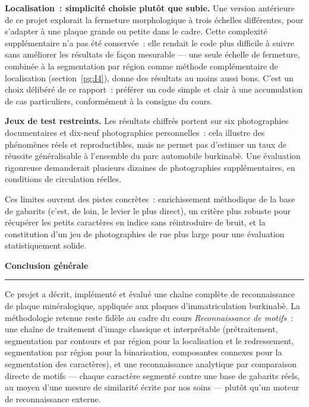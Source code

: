 \documentclass[11pt,a4paper]{article}
\newcommand{\titrecentre}[1]{%
  \begingroup
  \centering\normalfont\huge\bfseries\sffamily#1\par
  \endgroup
  \begin{center}\vspace{4pt}\rule{4cm}{0.8pt}\end{center}
  \vspace{16pt}
}
\begin{document}
\textbf{Localisation~: simplicité choisie plutôt que subie.} Une version antérieure de ce projet explorait la fermeture morphologique à trois échelles différentes, pour s'adapter à une plaque grande ou petite dans le cadre. Cette complexité supplémentaire n'a pas été conservée~: elle rendait le code plus difficile à suivre sans améliorer les résultats de façon mesurable --- une seule échelle de fermeture, combinée à la segmentation par région comme méthode complémentaire de localisation (section~\ref{pg:I4}), donne des résultats au moins aussi bons. C'est un choix délibéré de ce rapport~: préférer un code simple et clair à une accumulation de cas particuliers, conformément à la consigne du cours.

\textbf{Jeux de test restreints.} Les résultats chiffrés portent sur six photographies documentaires et dix-neuf photographies personnelles~: cela illustre des phénomènes réels et reproductibles, mais ne permet pas d'estimer un taux de réussite généralisable à l'ensemble du parc automobile burkinabè. Une évaluation rigoureuse demanderait plusieurs dizaines de photographies supplémentaires, en conditions de circulation réelles.

Ces limites ouvrent des pistes concrètes~: enrichissement méthodique de la base de gabarits (c'est, de loin, le levier le plus direct), un critère plus robuste pour récupérer les petits caractères en indice sans réintroduire de bruit, et la constitution d'un jeu de photographies de rue plus large pour une évaluation statistiquement solide.

\clearpage
\titrecentre{Conclusion générale}
\label{pg:conclusion}

Ce projet a décrit, implémenté et évalué une chaîne complète de reconnaissance de plaque minéralogique, appliquée aux plaques d'immatriculation burkinabè. La méthodologie retenue reste fidèle au cadre du cours \emph{Reconnaissance de motifs}~: une chaîne de traitement d'image classique et interprétable (prétraitement, segmentation par contours et par région pour la localisation et le redressement, segmentation par région pour la binarisation, composantes connexes pour la segmentation des caractères), et une reconnaissance analytique par comparaison directe de motifs --- chaque caractère segmenté contre une base de gabarits réels, au moyen d'une mesure de similarité écrite par nos soins --- plutôt qu'un moteur de reconnaissance externe.
\end{document}
